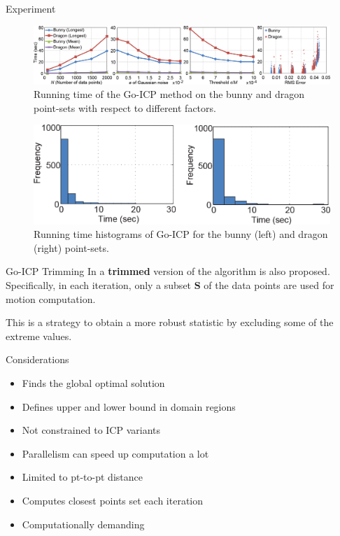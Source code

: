 \documentclass[aspectratio=1610]{beamer}
\newcommand*\pro{%
  \item[\color{ProGreen}\scalebox{1.5}{\faThumbsOUp}]}
\newcommand*\con{%
  \item[\color{ConRed}\scalebox{1.5}{\faThumbsODown}]}
\renewcommand*{\cite}{\parencite}
\begin{document}
\begin{frame}[allowframebreaks]{Experiment}
\begin{figure}[htbp]
\begin{center}
  \includegraphics[width=\textwidth,height=0.5\textheight,keepaspectratio]{imgs/GOICP_eval.png}
  \caption{Running time of the Go-ICP method on the bunny and dragon point-sets with respect to different factors.}
  \label{fig:goicp_evaluation}
\end{center}
\end{figure}
\hspace{2em}
\begin{figure}[htbp]
\begin{center}
  \includegraphics[width=\textwidth,height=0.5\textheight,keepaspectratio]{imgs/GOICP_timehistogram.png}
  \caption{Running time histograms of Go-ICP for the bunny (left) and dragon (right) point-sets.}
  \label{fig:goicp_timehistogram}
\end{center}
\end{figure}
\end{frame}

\begin{frame}{Go-ICP Trimming}
In \cite{goicp} a \textbf{trimmed} version of the algorithm is also proposed. Specifically, in each iteration, only a subset $\bm{S}$ of the data points are used for motion computation.

This is a strategy to obtain a more robust statistic by excluding some of the extreme values.
\end{frame}

\begin{frame}{Considerations}
\begin{itemize}[wide, labelsep=2em]
  \pro Finds the global optimal solution
  \pro Defines upper and lower bound in domain regions
  \pro Not constrained to ICP variants
  \pro Parallelism can speed up computation a lot
  \con Limited to pt-to-pt distance
  \con Computes closest points set each iteration
  \con Computationally demanding
\end{itemize}
\end{frame}
\end{document}
